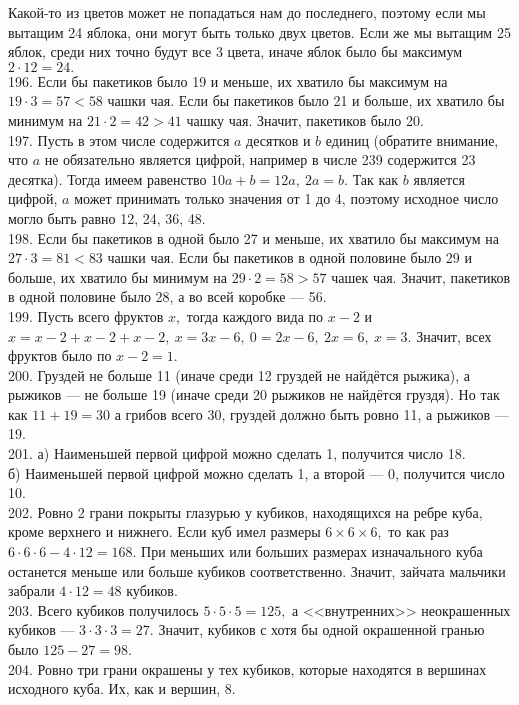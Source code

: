 Какой-то из цветов может не попадаться нам до последнего, поэтому если мы вытащим 24 яблока, они могут быть только двух цветов. Если же мы вытащим 25 яблок, среди них точно будут все 3 цвета, иначе яблок было бы максимум $2\cdot12=24.$\\
196. Если бы пакетиков было 19 и меньше, их хватило бы максимум на $19\cdot3=57<58$ чашки чая. Если бы пакетиков было 21 и больше, их хватило бы минимум на $21\cdot2=42>41$ чашку чая. Значит, пакетиков было 20.\\
197. Пусть в этом числе содержится $a$ десятков и $b$ единиц (обратите внимание, что $a$ не обязательно является цифрой, например в числе 239 содержится 23 десятка). Тогда имеем равенство $10a+b=12a,\ 2a=b.$ Так как $b$ является цифрой, $a$ может принимать только значения от 1 до 4, поэтому исходное число могло быть равно 12, 24, 36, 48.\\
198. Если бы пакетиков в одной было 27 и меньше, их хватило бы максимум на $27\cdot3=81<83$ чашки чая. Если бы пакетиков в одной половине было 29 и больше, их хватило бы минимум на $29\cdot2=58>57$ чашек чая. Значит, пакетиков в одной половине было 28, а во всей коробке --- 56.\\
199. Пусть всего фруктов $x,$  тогда каждого вида по $x-2$ и $x=x-2+x-2+x-2,\ x=3x-6,\ 0=2x-6,\ 2x=6,\ x=3.$ Значит, всех фруктов было по $x-2=1.$\\
200. Груздей не больше 11 (иначе среди 12 груздей не найдётся рыжика), а рыжиков --- не больше 19 (иначе среди 20 рыжиков не найдётся груздя). Но так как $11+19=30$ а грибов всего 30, груздей должно быть ровно 11, а рыжиков --- 19.\\
201. а) Наименьшей первой цифрой можно сделать 1, получится число 18.\\
б) Наименьшей первой цифрой можно сделать 1, а второй --- 0, получится число 10.\\
202. Ровно 2 грани покрыты глазурью у кубиков, находящихся на ребре куба, кроме верхнего и нижнего. Если куб имел размеры $6\times6\times6,$ то как раз $6\cdot6\cdot6-4\cdot12=168.$ При меньших или больших размерах изначального куба останется меньше или больше кубиков соответственно. Значит, зайчата мальчики забрали $4\cdot12=48$ кубиков.\\
203. Всего кубиков получилось $5\cdot5\cdot5=125,$ а <<внутренних>> неокрашенных кубиков --- $3\cdot3\cdot3=27.$ Значит, кубиков с хотя бы одной окрашенной гранью было $125-27=98.$\\
204. Ровно три грани окрашены у тех кубиков, которые находятся в вершинах исходного куба. Их, как и вершин, 8.\\
